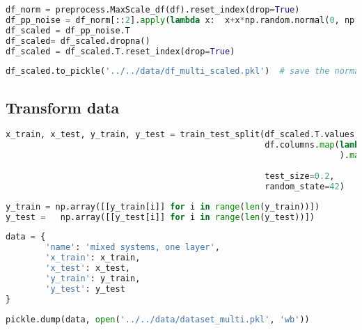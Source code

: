\begin{lstlisting}[language=Python]
df_norm = preprocess.MaxScale_df(df).reset_index(drop=True)                                                    # each spectrum is scaled to 1
df_pp_noise = df_norm[::2].apply(lambda x:  x+x*np.random.normal(0, np.random.randint(1,3)*0.01 , len(x)))     # reduce size to 1024 and add noise
df_scaled = df_pp_noise.T
df_scaled= df_scaled.dropna()
df_scaled = df_scaled.T.reset_index(drop=True)
\end{lstlisting}

\begin{lstlisting}[language=Python]
df_scaled.to_pickle('../../data/df_multi_scaled.pkl')  # save the normalized, scaled df
\end{lstlisting}

\hypertarget{transform-data}{%
\subsection*{Transform data}\label{transform-data}}

\begin{lstlisting}[language=Python]
x_train, x_test, y_train, y_test = train_test_split(df_scaled.T.values,
                                                    df.columns.map(lambda x: x.split('_')[:-1]
                                                                   ).map(base.pair_list_to_tuples
                                                                         ).map(base.one_hot_encode_concentrations),
                                                    test_size=0.2,
                                                    random_state=42)
\end{lstlisting}

\begin{lstlisting}[language=Python]
y_train = np.array([[y_train[i]] for i in range(len(y_train))])
y_test =   np.array([[y_test[i]] for i in range(len(y_test))])
\end{lstlisting}

\begin{lstlisting}[language=Python]
data = {
        'name': 'mixed systems, one layer',
        'x_train': x_train,
        'x_test': x_test,
        'y_train': y_train,
        'y_test': y_test
}
\end{lstlisting}

\begin{lstlisting}[language=Python]
pickle.dump(data, open('../../data/dataset_multi.pkl', 'wb'))
\end{lstlisting}

